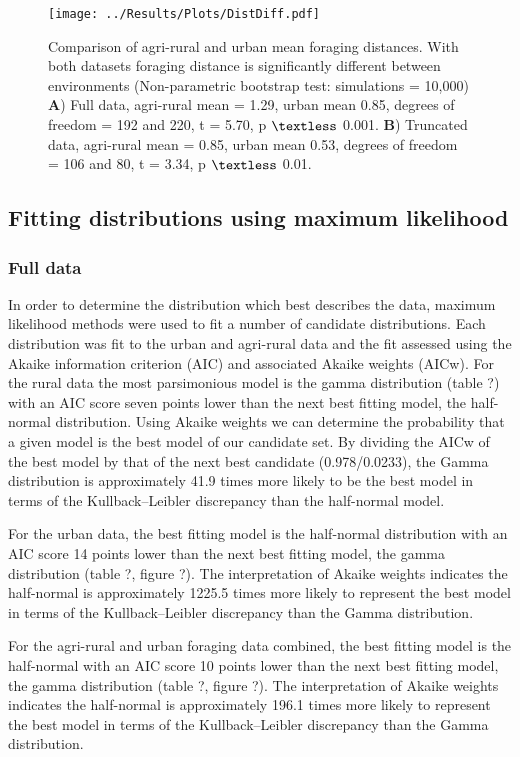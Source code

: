 \documentclass[11pt,usenames,dvipsnames,a4paper]{article}
\begin{document}
\begin{figure}[H]
	\centering
	\texttt{[image: ../Results/Plots/DistDiff.pdf]}
	\caption{Comparison of agri-rural and urban mean foraging distances. With both datasets foraging distance is significantly different between environments (Non-parametric bootstrap test: simulations = 10,000) \textbf{A}) Full data, agri-rural mean = 1.29, urban mean 0.85, degrees of freedom = 192 and 220, t = 5.70, p $\textless$ 0.001. \textbf{B}) Truncated data, agri-rural mean = 0.85, urban mean 0.53, degrees of freedom = 106 and 80, t = 3.34, p $\textless$ 0.01.}
\end{figure}

\subsection{Fitting distributions using maximum likelihood}

\subsubsection{Full data}

\begin{linenumbers}
\hspace{\parindent}
In order to determine the distribution which best describes the data, maximum likelihood methods were used to fit a number of candidate distributions. Each distribution was fit to the urban and agri-rural data and the fit assessed using the Akaike information criterion (AIC) and associated Akaike weights (AICw). For the rural data the most parsimonious model is the gamma distribution (table ?) with an AIC score seven points lower than the next best fitting model, the half-normal distribution. Using Akaike weights we can determine the probability that a given model is the best model of our candidate set. By dividing the AICw of the best model by that of the next best candidate (0.978/0.0233), the Gamma distribution is approximately 41.9 times more likely to be the best model in terms of the Kullback–Leibler discrepancy than the half-normal model.

For the urban data, the best fitting model is the half-normal distribution with an AIC score 14 points lower than the next best fitting model, the gamma distribution (table ?, figure ?). The interpretation of Akaike weights indicates the half-normal is approximately 1225.5 times more likely to represent the best model in terms of the Kullback–Leibler discrepancy than the Gamma distribution.

For the agri-rural and urban foraging data combined, the best fitting model is the half-normal with an AIC score 10 points lower than the next best fitting model, the gamma distribution (table ?, figure ?). The interpretation of Akaike weights indicates the half-normal is approximately 196.1 times more likely to represent the best model in terms of the Kullback–Leibler discrepancy than the Gamma distribution.
\end{linenumbers}
\end{document}
